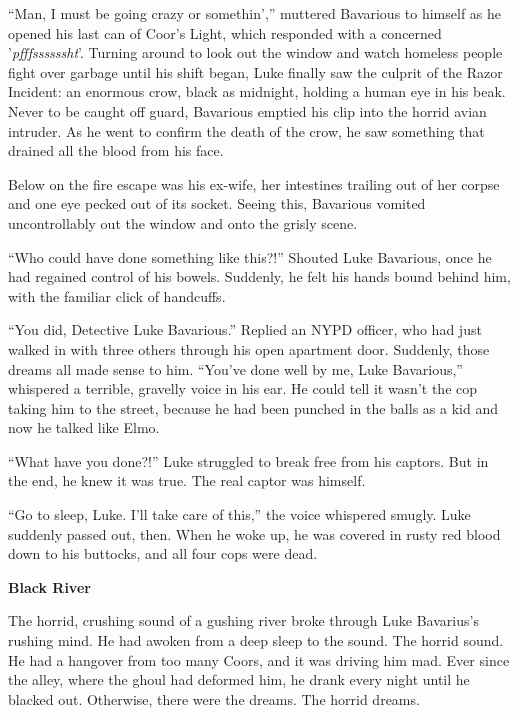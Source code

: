 ``Man, I must be going crazy or somethin','' muttered Bavarious to
himself as he opened his last can of Coor's Light, which responded
with a concerned '{\em pfffssssssht}'. Turning around to look out
the window and watch homeless people fight over garbage until his
shift began, Luke finally saw the culprit of the Razor Incident: an
enormous crow, black as midnight, holding a human eye in his beak.
Never to be caught off guard, Bavarious emptied his clip into the
horrid avian intruder. As he went to confirm the death of the crow,
he saw something that drained all the blood from his face.



Below on the fire escape was his ex-wife, her intestines trailing
out of her corpse and one eye pecked out of its socket. Seeing
this, Bavarious vomited uncontrollably out the window and onto the
grisly scene.



``Who could have done something like this?!'' Shouted Luke Bavarious,
once he had regained control of his bowels. Suddenly, he felt his
hands bound behind him, with the familiar click of handcuffs.



``You did, Detective Luke Bavarious.'' Replied an NYPD officer, who
had just walked in with three others through his open apartment
door. Suddenly, those dreams all made sense to him. ``You've done
well by me, Luke Bavarious,'' whispered a terrible, gravelly voice
in his ear. He could tell it wasn't the cop taking him to the
street, because he had been punched in the balls as a kid and now
he talked like Elmo.



``What have you done?!'' Luke struggled to break free from his
captors. But in the end, he knew it was true. The real captor was
himself.



``Go to sleep, Luke. I'll take care of this,'' the voice whispered
smugly. Luke suddenly passed out, then. When he woke up, he was
covered in rusty red blood down to his buttocks, and all four cops
were dead. 
 





{\bf Black River}



The horrid, crushing sound of a gushing river broke through Luke
Bavarius's rushing mind. He had awoken from a deep sleep to the
sound. The horrid sound. He had a hangover from too many Coors, and
it was driving him mad. Ever since the alley, where the ghoul had
deformed him, he drank every night until he blacked out. Otherwise,
there were the dreams. The horrid dreams.

